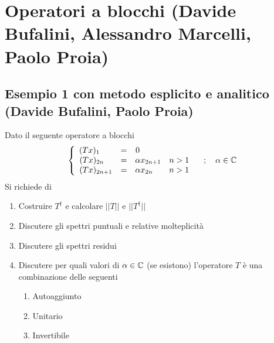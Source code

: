 \section{Operatori a blocchi (Davide Bufalini, Alessandro Marcelli, Paolo Proia)}
\subsection{Esempio 1 con metodo esplicito e analitico (Davide Bufalini, Paolo Proia)}
Dato il seguente operatore a blocchi
\begin{align}
	\left\{ \begin{array}{ccc} (Tx)_1 \quad\;\; &= &0 \qquad \qquad \qquad\\ (Tx)_{2n} \quad &= &\alpha x_{2n+1} \quad n> 1\\ (Tx)_{2n+1} &= &\alpha x_{2n} \quad\quad n> 1 \end{array} \right. \quad ; \quad \alpha \in \mathbb{C}
\end{align}
Si richiede di
\begin{enumerate}
	\item Costruire $T^\dagger$ e calcolare $||T||$ e  $||T^\dagger||$
	\item Discutere gli spettri puntuali e relative molteplicità
	\item Discutere gli spettri residui
	\item Discutere per quali valori di $\alpha \in \mathbb{C}$ (se esistono) l'operatore $T$ è una combinazione delle seguenti
	\begin{enumerate}
		\item Autoaggiunto
		\item Unitario
		\item Invertibile
	\end{enumerate}
\end{enumerate}

